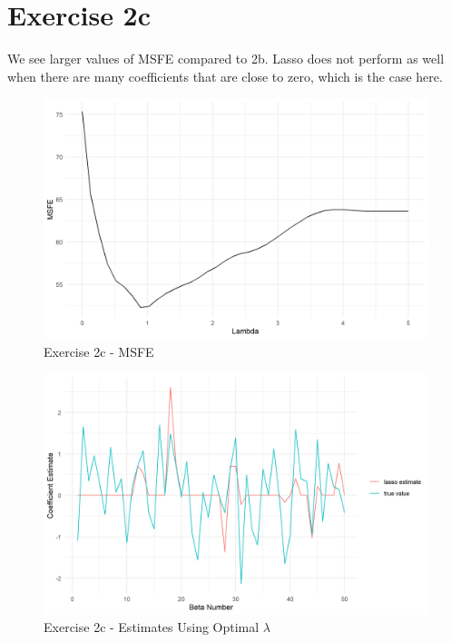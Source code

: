 \documentclass[reqno,12pt,notitlepage]{article}
\begin{document}
\section*{Exercise 2c}
We see larger values of MSFE compared to 2b. Lasso does not perform as well when there are many coefficients that are close to zero, which is the case here. 
\begin{figure}[!h]
    \centering
    \includegraphics[width=.8\textwidth]{lambda_2c.png}
    \caption{Exercise 2c - MSFE}
\end{figure}


\begin{figure}[!h]
    \centering
    \includegraphics[width=.8\textwidth]{estimate_2c.png}
    \caption{Exercise 2c - Estimates Using Optimal $\lambda$}
\end{figure}

\newpage
\end{document}
